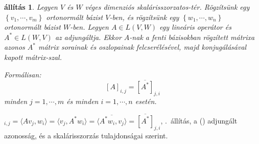 \documentclass[9pt, a4paper, showtrims]{memoir}
\makeatletter
\renewenvironment{proof}[1][\proofname]
    {\par\pushQED{\qed}%
    \normalfont \topsep6\p@\@plus6\p@\relax
    \trivlist
    \item[\hskip\labelsep
        \itshape
    #1\@addpunct{:}]\ignorespaces}
    {\popQED\endtrivlist\@endpefalse}
\theoremstyle{plain}
\newtheorem{proposition}{állítás}[chapter]
\theoremstyle{remark}
\theoremstyle{definition}
\newcommand{\ip}[2]{\langle#1,#2\rangle}
\makeatother
\begin{document}
\begin{proposition}
    Legyen $V$ és $W$ véges dimenziós skalárisszorzatos-tér.
    Rögzítsünk egy $\left\{ v_1,\cdots,v_m \right\}$ ortonormált bázist $V$-ben,
    és rögzítsünk egy $\left\{w_1,\cdots,w_n\right\}$ ortonormált bázist $W$-ben.
    Legyen $A\in L\left( V,W \right)$ egy lineáris operátor és $A^\ast\in L\left( W,V \right)$ az adjungáltja.
    Ekkor $A$-nak a fenti bázisokban rögzített mátrixa azonos 
    $A^\ast$ mátrix sorainak és oszlopainak felcserélésével, majd konjugálásával kapott mátrix-szal.

    Formálisan:
    \[
        \left[ A \right]_{i,j}=\overline{\left[ A^\ast \right]}_{j,i}
    \]
    minden $j=1,\cdots,m$ és minden $i=1,\cdots,n$ esetén.
\end{proposition}
\begin{proof}
    \begin{math}
        [A]_{i,j}
        =
        \ip{Av_j}{w_i}
        =
        \ip{v_j}{A^\ast w_i}
        =
        \overline{
            \ip{A^\ast w_i}{v_j}
        }
        =
        \overline{
            [A^\ast]
        }_{j,i}
    \end{math},
    .~állítás, a (\dag) adjungált azonosság, és a skalárisszorzás tulajdonságai szerint.
\end{proof}
\end{document}

